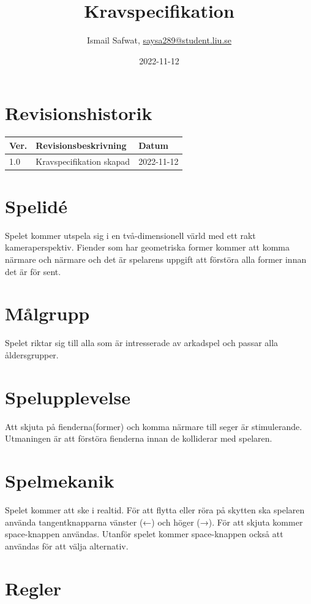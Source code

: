 \documentclass{TDP005mall}
\author{
  Ismail Safwat, \url{saysa289@student.liu.se}}
\title{Kravspecifikation}
\date{2022-11-12}
\begin{document}
\projectpage
\section{Revisionshistorik}
\begin{table}[!h]
\begin{tabularx}{\linewidth}{|l|X|l|}
\hline
Ver. & Revisionsbeskrivning & Datum \\\hline
1.0 & Kravspecifikation skapad & 2022-11-12 \\\hline
\end{tabularx}
\end{table}


\section{Spelidé}
 Spelet kommer utspela sig i en två-dimensionell värld med ett rakt kameraperspektiv. Fiender som har geometriska former kommer att komma närmare och närmare och det är spelarens uppgift att förstöra alla former innan det är för sent.
 
\section{Målgrupp}
 Spelet riktar sig till alla som är intresserade av arkadspel och passar alla åldersgrupper. 

\section{Spelupplevelse}
 Att skjuta på fienderna(former) och komma närmare till seger är stimulerande. Utmaningen är att förstöra fienderna innan de kolliderar med spelaren.

\section{Spelmekanik}
 Spelet kommer att ske i realtid. För att flytta eller röra på skytten ska spelaren använda tangentknapparna vänster (←) och höger (→). För att skjuta kommer space-knappen användas. Utanför spelet kommer space-knappen också att användas för att välja alternativ.

\section{Regler}
\end{document}
